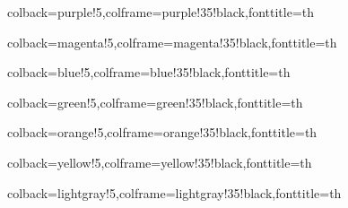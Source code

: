 



{colback=purple!5,colframe=purple!35!black,fonttitle=\bfseries}{th}

{colback=magenta!5,colframe=magenta!35!black,fonttitle=\bfseries}{th}

{colback=blue!5,colframe=blue!35!black,fonttitle=\bfseries}{th}

{colback=green!5,colframe=green!35!black,fonttitle=\bfseries}{th}

{colback=orange!5,colframe=orange!35!black,fonttitle=\bfseries}{th}

{colback=yellow!5,colframe=yellow!35!black,fonttitle=\bfseries}{th}

{colback=lightgray!5,colframe=lightgray!35!black,fonttitle=\bfseries}{th}
